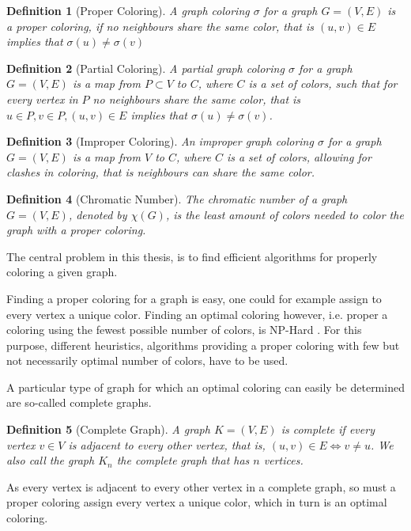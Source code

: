 \documentclass[a4paper]{article}
\newtheorem{definition}{Definition}[section]
\begin{document}
\begin{definition}[Proper Coloring]
    A graph coloring $\sigma$ for a graph $G = (V,E)$ is a proper coloring,
    if no neighbours share the same color,
    that is $(u,v) \in E$ implies that $\sigma(u) \neq \sigma(v)$
\end{definition}

\begin{definition}[Partial Coloring]{\cite{Constructive}}
    A partial graph coloring $\sigma$ for a graph $G = (V,E)$ is a map from $P \subset V$ to $C$,
    where $C$ is a set of colors, such that for every vertex in $P$ no neighbours 
    share the same color, that is $u \in P,v \in P, (u,v) \in E$  implies that $\sigma(u) \neq \sigma(v)$.
\end{definition}
\begin{definition}[Improper Coloring]{\cite{Constructive}}
    An improper graph coloring $\sigma$ for a graph $G = (V,E)$ is a map from
    $V$ to $C$, where $C$ is a set of colors, allowing for clashes in coloring,
    that is neighbours can share the same color.
\end{definition}
\begin{definition}[Chromatic Number]
    The chromatic number of a graph $G = (V,E)$, denoted by $\chi(G)$, is the
    least amount of colors needed to color the graph with a proper coloring.
\end{definition}
The central problem in this thesis, is to find efficient algorithms 
for properly coloring a given graph.

Finding a proper coloring for a graph is easy, one could for example assign to
every vertex a unique color. Finding an optimal coloring however, i.e. proper a
coloring using the fewest possible number of colors, is NP-Hard \cite{NPHard}.
For this purpose, different heuristics, algorithms providing a proper coloring
with few but not necessarily optimal number of colors, have to be used.

A particular type of graph for which an optimal coloring can easily be determined 
are so-called complete graphs.
\begin{definition}[Complete Graph]
    A graph $K = (V,E)$ is complete if every vertex $v \in V$ is adjacent to
    every other vertex, that is, $ (u,v) \in E \iff v \neq u$. We also call the
    graph $K_n$ the complete graph that has $n$ vertices.
\end{definition}
As every vertex is adjacent to every other vertex in a complete graph, so must a proper coloring
assign every vertex a unique color, which in turn is an optimal coloring.
\end{document}
